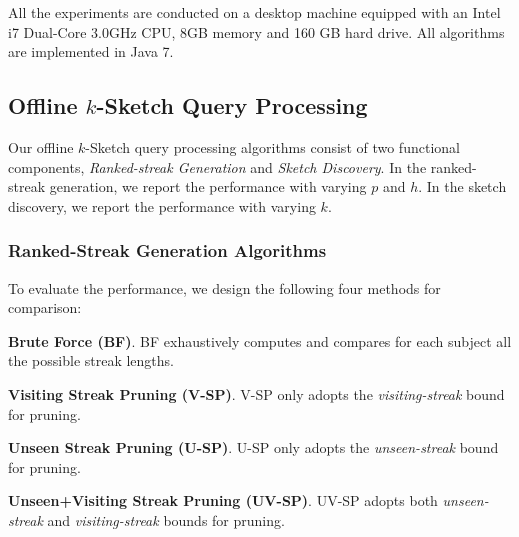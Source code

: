 All the experiments are conducted on a desktop machine equipped with an Intel i7 Dual-Core 3.0GHz CPU, 8GB memory and 160 GB hard drive. All algorithms are implemented in Java 7. 
 
\subsection{Offline $k$-Sketch Query Processing}
\label{subsec:exp-offline}
Our offline $k$-Sketch query processing algorithms consist of two functional components, \emph{Ranked-streak Generation}
and \emph{Sketch Discovery}. In the ranked-streak generation, we report the performance with varying $p$ and $h$. In the sketch discovery, we report the performance with varying $k$.

\subsubsection{Ranked-Streak Generation Algorithms}
To evaluate the performance, we design the following four methods for comparison:

\noindent\textbf{Brute Force (BF)}. BF exhaustively computes and compares for each subject all the possible streak lengths. 

\noindent\textbf{Visiting Streak Pruning (V-SP)}. V-SP only adopts the \emph{visiting-streak} bound for pruning.

\noindent\textbf{Unseen Streak Pruning (U-SP)}. U-SP only adopts the \emph{unseen-streak} bound for pruning. 

\noindent\textbf{Unseen+Visiting Streak Pruning (UV-SP)}. UV-SP adopts both \emph{unseen-streak} and \emph{visiting-streak} bounds for pruning.

